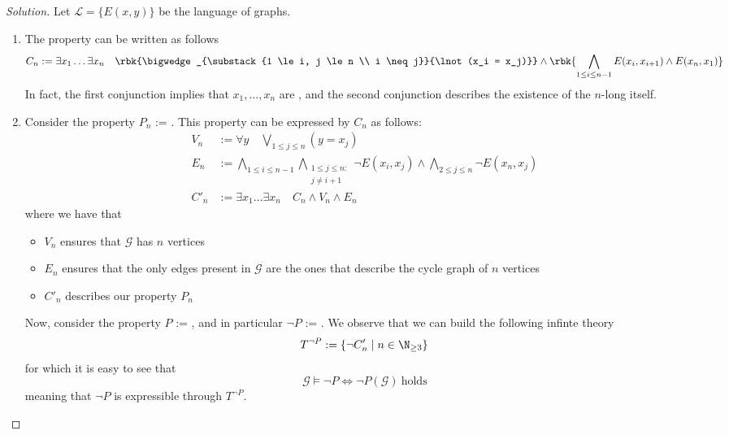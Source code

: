 \documentclass[a4paper, 12pt]{report}
\begin{document}
    \begin{proof}[Solution]
        Let $\mathcal L = \{E(x, y)\}$ be the language of graphs.

        \begin{enumerate}
            \item The property  can be written as follows $$C_n := \exists x_1 \ldots \exists x_n \quad \rbk{\bigwedge_{\substack{1 \le i, j \le n \\ i \neq j}}{\lnot(x_i = x_j)}} \land \rbk{\bigwedge_{1 \le i \le n - 1}{E(x_i, x_{i + 1})} \land E(x_n, x_1)}$$ In fact, the first conjunction implies that $x_1, \ldots, x_n$ are , and the second conjunction describes the existence of the $n$-long  itself.
            \item Consider the property $P_n$ := . This property can be expressed by  $C_n$ as follows:
                \begin{equation*}
                    \begin{split}
                        V_n &:= \forall y \quad \bigvee_{1 \le j \le n}{(y = x_j)} \\
                        E_n &:= \displaystyle \bigwedge_{1 \le i \le n - 1}{\bigwedge_{\substack{1 \le j \le n : \\ j \neq i + 1}}{\lnot E(x_i, x_j)}} \land \bigwedge_{2 \le j \le n}{\lnot E(x_n, x_j)} \\
                        C'_n &:= \exists x_1 \ldots  \exists x_n \quad C_n \land V_n \land E_n
                    \end{split}
                \end{equation*}
                where we have that

                \begin{itemize}
                    \item $V_n$ ensures that $\mathcal G$ has  $n$ vertices
                    \item $E_n$ ensures that the only edges present in $\mathcal G$ are the ones that describe the cycle graph of $n$ vertices
                    \item $C'_n$ describes our property $P_n$
                \end{itemize}

                Now, consider the property $P$ := , and in particular $\lnot P$ := . We observe that we can build the following infinte theory $$T^{\lnot P} := \{\lnot C_n' \mid n \in \N_{\ge 3} \}$$ for which it is easy to see that $$\mathcal G \models \lnot P \iff \lnot P(\mathcal G) \ \mathrm{holds}$$ meaning that $\lnot P$ is expressible through $T^{\lnot P}$.


\end{enumerate}
\end{proof}
\end{document}
